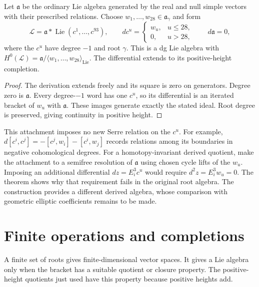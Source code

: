 \begin{proposition}
\label{prop:bkm-free-dg-attachment}
Let $\mathfrak a$ be the ordinary Lie algebra generated by the real
and null simple vectors with their prescribed relations.
Choose $w_1,\ldots,w_{28}\in\mathfrak a_\gamma$ and form
\[
 \mathcal L=\mathfrak a*\operatorname{Lie}(c^1,\ldots,c^{93}),
 \qquad dc^u=\begin{cases}w_u,&u\leq28,\\0,&u>28,\end{cases}
 \qquad d\mathfrak a=0,
\]
where the $c^u$ have degree $-1$ and root $\gamma$.
This is a dg Lie algebra with
$H^0(\mathcal L)=\mathfrak a/\langle w_1,\ldots,w_{28}\rangle_{\mathrm{Lie}}$.
The differential extends to its positive-height completion.
\end{proposition}
\begin{proof}
The derivation extends freely and its square is zero on generators.
Degree zero is $\mathfrak a$. Every degree-$-1$ word has one
$c^u$, so its differential is an iterated bracket of $w_u$ with
$\mathfrak a$. These images generate exactly the stated ideal.
Root degree is preserved, giving continuity in positive height.
\end{proof}

This attachment imposes no new Serre relation on the $c^u$.
For example, $d[c^i,c^j]=-[c^j,w_i]-[c^i,w_j]$ records relations
among its boundaries in negative cohomological degrees.
For a homotopy-invariant derived quotient, make the attachment to a
semifree resolution of $\mathfrak a$ using chosen cycle lifts of
the $w_u$. Imposing an additional differential
$dz=E_i^3c^u$ would require $d^2z=E_i^3w_u=0$. The theorem
shows why that requirement fails in the original root algebra.
The construction provides a different derived algebra, whose
comparison with geometric elliptic coefficients remains to be made.

\section{Finite operations and completions}
\label{sec:bkm-finite-operations}

A finite set of roots gives finite-dimensional vector spaces.
It gives a Lie algebra only when the bracket has a suitable
quotient or closure property. The positive-height quotients just
used have this property because positive heights add.

